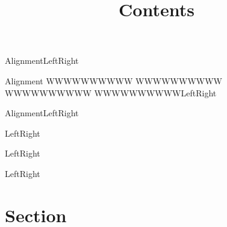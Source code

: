 \documentclass[fontset=fandol]{nbeamer}
\newcommand{\edges}{Left\hfill Right}
\begin{document}
\begin{frame}[t]{Alignment}\edges\end{frame}
\begin{frame}[c,nbeamer={grid=false}]{Alignment WWWWWWWWWW WWWWWWWWWW WWWWWWWWWW WWWWWWWWWW}\edges\end{frame}
\begin{frame}[b]{Alignment}\edges\end{frame}
\begin{frame}[t]\edges\end{frame}
\begin{frame}[c]\edges\end{frame}
\begin{frame}[b]\edges\end{frame}
\section{Section}
\begin{frame}
  \title{Contents}
\end{frame}
\end{document}
